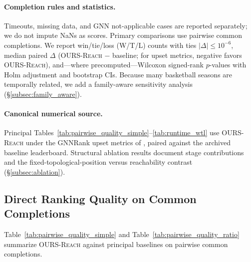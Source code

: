 \documentclass{article}
\begin{document}
\paragraph{Completion rules and statistics.}
Timeouts, missing data, and GNN not-applicable cases are reported separately; we do not impute NaNs as scores.
Primary comparisons use pairwise common completions.
We report win/tie/loss (W/T/L) counts with ties $|\Delta|\le 10^{-6}$, median paired $\Delta$ (\textsc{OURS-Reach} $-$ baseline; for upset metrics, negative favors \textsc{OURS-Reach}), and---where precomputed---Wilcoxon signed-rank $p$-values with Holm adjustment and bootstrap CIs.
Because many basketball seasons are temporally related, we add a family-aware sensitivity analysis (\S\ref{subsec:family_aware}).

\paragraph{Canonical numerical source.}
Principal Tables~\ref{tab:pairwise_quality_simple}--\ref{tab:runtime_wtl} use \textsc{OURS-Reach} under the GNNRank upset metrics of \citet{he22}, paired against the archived baseline leaderboard.
Structural ablation results document stage contributions and the fixed-topological-position versus reachability contrast (\S\ref{subsec:ablation}).

\subsection{Direct Ranking Quality on Common Completions}
\label{subsec:main_quality}

Table~\ref{tab:pairwise_quality_simple} and Table~\ref{tab:pairwise_quality_ratio}
summarize \textsc{OURS-Reach} against principal baselines on pairwise common completions.
\end{document}
